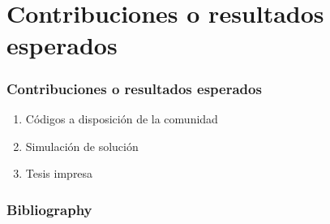 \documentclass[
	11pt, %
]{beamer}
\begin{document}
\begin{frame}
  \cite{CIESLEWSKI2017}\\
  \cite{USENKO2017}\\
  \cite{MOHTA2017}\\
\end{frame}
\begin{frame}
  \cite{LIN2017}\\
  \cite{PAPACHRISTOS2017}\\
  \cite{OLEYNIKOVA2018}\\
\end{frame}
\begin{frame}
  \cite{GAO2018}\\
  \cite{FLORENCE2018}\\
  \cite{SELIN2019}\\
\end{frame}
\begin{frame}
  \cite{COLLINS2019}\\
  \cite{CINVES2021}\\
  \cite{RACER2022}\\
\end{frame}
\begin{frame}
  \cite{WESTHEIDER2023}\\
  \cite{BARTOLOMEI2023}\\
\end{frame}

\section{Contribuciones o resultados esperados}

\begin{frame}

  \frametitle{Contribuciones o resultados esperados}

  \begin{enumerate}
  \item<1-> Códigos a disposición de la comunidad
  \item<2-> Simulación de solución
  \item<3-> Tesis impresa
  \end{enumerate}
  
\end{frame}

\begin{frame}
  \frametitle{Bibliography}
  
  
\end{frame}
\end{document}
